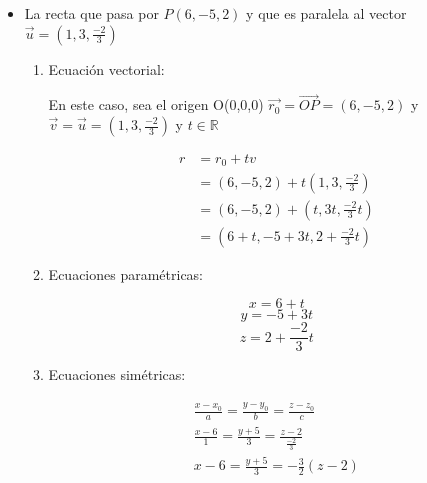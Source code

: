 \documentclass[12pt]{article}
\begin{document}
\begin {itemize}
  
\item La recta que pasa por $P(6,-5,2)$ y que es paralela al vector $\vec{u}=(1,3,\frac{-2}{3})$
  
  \begin{enumerate}[format=\textbf]
    
  \item Ecuación vectorial:
    
    En este caso, sea el origen O(0,0,0) $\vec{r_0} = \vec{OP} = (6, -5, 2)$  y  $\vec{v} = \vec{u} = (1,3,\frac{-2}{3})  $ y $t \in \mathds{R} $
    
    \begin{equation*}
      \begin{split}
        r &= r_0 + tv \\
        &= (6, -5, 2)  + t(1,3,\frac{-2}{3}) \\
        &= (6, -5, 2)  + (t,3t,\frac{-2}{3}t)\\
        &= (6+t, -5+3t, 2 + \frac{-2}{3}t)
      \end{split}
    \end{equation*}
    
  \item Ecuaciones paramétricas:
    
    $$x = 6+t $$
    $$y = -5+3t$$
    $$z =  2 + \frac{-2}{3}t $$
    
  \item Ecuaciones simétricas:
    
    \begin{equation*}
      \begin{split}
        \frac{x-x_0}{a} = \frac{y-y_0}{b} = \frac{z-z_0}{c} \\
        \frac{x-6}{1} = \frac{y+5}{3} = \frac{z-2}{\frac{-2}{3}} \\
        x-6 = \frac{y+5}{3} = -\frac{3}{2}(z-2) \\
      \end{split}
    \end{equation*}
    
  \end{enumerate}
  
\end{itemize}
\end{document}
